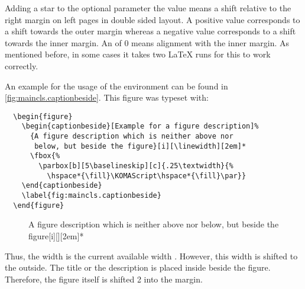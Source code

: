 Adding a star to the optional parameter  the value means
a shift relative to the right margin on left pages in double sided
layout. A positive value corresponds to a shift towards the outer
margin whereas a negative value corresponds to a shift towards the
inner margin. An  of 0 means alignment with the
inner margin. As mentioned before, in some cases it takes two \LaTeX{}
runs for this to work correctly.

\begin{Example}
  An example for the usage of the  environment
  can be found in \autoref{fig:maincls.captionbeside}.
  This figure was typeset with:
\begin{lstlisting}
  \begin{figure}
    \begin{captionbeside}[Example for a figure description]%
      {A figure description which is neither above nor
       below, but beside the figure}[i][\linewidth][2em]*
      \fbox{%
        \parbox[b][5\baselineskip][c]{.25\textwidth}{%
          \hspace*{\fill}\KOMAScript\hspace*{\fill}\par}}
    \end{captionbeside}
    \label{fig:maincls.captionbeside}
  \end{figure}
\end{lstlisting}
  \begin{figure}
    \begin{captionbeside}%
      {A figure description which is neither above nor 
       below, but beside the figure}[i][\linewidth][2em]*
    \end{captionbeside}
    \label{fig:maincls.captionbeside}
  \end{figure}
  Thus, the width is the current available width
  . However, this width is shifted
  \PValue{2em} to the outside. The title or the description is placed
  inside beside the figure. Therefore, the figure itself is shifted
  2 into the margin.
\end{Example}
%


